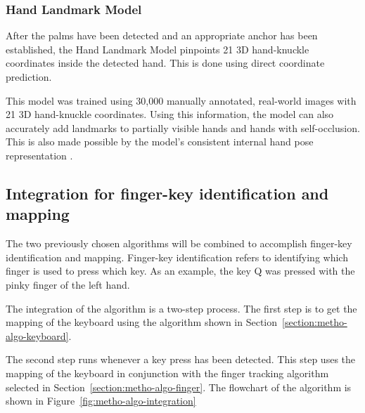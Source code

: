 \documentclass{report}
\begin{document}
\subsubsection{Hand Landmark Model}
After the palms have been detected and an appropriate anchor has been
established, the Hand Landmark Model pinpoints 21 3D hand-knuckle coordinates
inside the detected hand. This is done using direct coordinate prediction.

This model was trained using 30,000 manually annotated, real-world images with
21 3D hand-knuckle coordinates. Using this information, the model can also
accurately add landmarks to partially visible hands and hands with
self-occlusion. This is also made possible by the model's consistent internal
hand pose representation \parencite{mediapipe-hands}.

\subsection{Integration for finger-key identification and mapping}

The two previously chosen algorithms will be combined to accomplish finger-key
identification and mapping. Finger-key identification refers to identifying
which finger is used to press which key. As an example, the key Q was pressed
with the pinky finger of the left hand.

The integration of the algorithm is a two-step process. The first step is to get
the mapping of the keyboard using the algorithm shown in
Section~\ref{section:metho-algo-keyboard}.

The second step runs whenever a key press has been detected. This step uses the
mapping of the keyboard in conjunction with the finger tracking algorithm
selected in Section~\ref{section:metho-algo-finger}. The flowchart of the
algorithm is shown in Figure~\ref{fig:metho-algo-integration}
\end{document}
